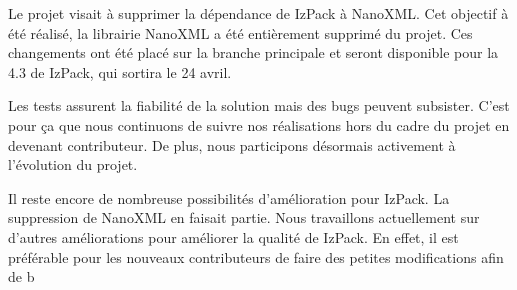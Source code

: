 Le projet visait à supprimer la dépendance de IzPack à NanoXML.
Cet objectif à été réalisé, la librairie NanoXML a été entièrement supprimé du projet.
Ces changements ont été placé sur la branche principale et seront disponible pour la 4.3 de IzPack, qui sortira le 24 avril.


Les tests assurent la fiabilité de la solution mais des bugs peuvent subsister.
C'est pour ça que nous continuons de suivre nos réalisations hors du cadre du projet en devenant contributeur.
De plus, nous participons désormais activement à l'évolution du projet.

Il reste encore de nombreuse possibilités d'amélioration pour IzPack.
La suppression de NanoXML en faisait partie.
Nous travaillons actuellement sur d'autres améliorations pour améliorer la qualité de IzPack.
En effet, il est préférable pour les nouveaux contributeurs de faire des petites modifications afin de b
